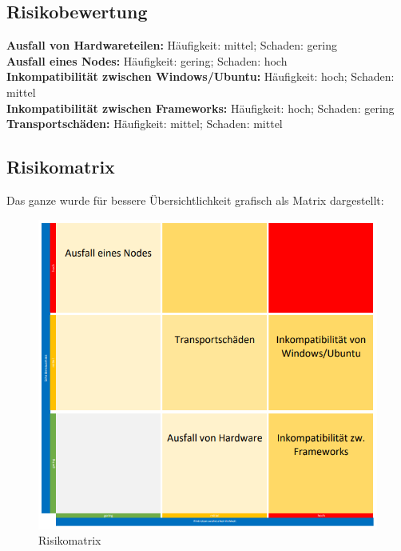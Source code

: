 \documentclass[12pt,oneside,a4paper,parskip]{scrbook}
\begin{document}
\subsection{Risikobewertung}
\textbf{Ausfall von Hardwareteilen:} Häufigkeit: mittel; Schaden: gering \\
\textbf{Ausfall eines Nodes:} Häufigkeit: gering; Schaden: hoch \\
\textbf{Inkompatibilität zwischen Windows/Ubuntu:} Häufigkeit: hoch; Schaden: mittel \\
\textbf{Inkompatibilität zwischen Frameworks:} Häufigkeit: hoch; Schaden: gering \\
\textbf{Transportschäden:} Häufigkeit: mittel; Schaden: mittel \\

\pagebreak

\subsection{Risikomatrix}

Das ganze wurde für bessere Übersichtlichkeit grafisch als Matrix dargestellt:

\begin{figure}[H]
\caption{Risikomatrix}
\label{risikoMatrix}
\centering
\includegraphics[scale=0.8]{pictures/risikoanalyse.png}
\end{figure}
\pagebreak
\end{document}
